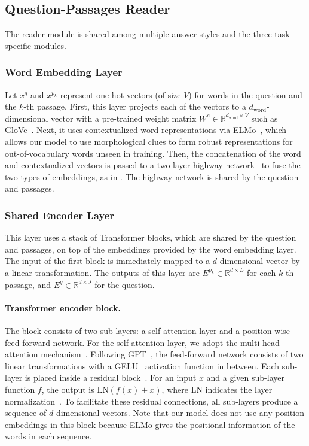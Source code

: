 \documentclass[11pt,a4paper]{article}
\theoremstyle{mydef}
\theoremstyle{myprob}
\begin{document}
\subsection{Question-Passages Reader}
\label{sec:reader}

The reader module is shared among multiple answer styles and the three task-specific modules.

\subsubsection{Word Embedding Layer}

Let $x^q$ and $x^{p_k}$ represent 
one-hot vectors (of size $V$) for 
words in the question and the $k$-th passage. First, this layer projects each of the vectors to a $d_\mathrm{word}$-dimensional vector with a pre-trained weight matrix $W^e \in \mathbb{R}^{d_\mathrm{word} \times V}$ such as GloVe~\citep{PenningtonSM14}. Next, it uses contextualized word representations via ELMo~\citep{PetersNIGCLZ18}, which 
allows our model to use morphological clues to form robust representations for out-of-vocabulary words unseen in training. 
Then, the concatenation of the word and contextualized vectors is passed to a two-layer highway network~\citep{SrivastavaGS15} to fuse the two types of embeddings, as in \citep{SeoKFH17}.
The highway network is shared %
by the question and passages. 

\subsubsection{Shared Encoder Layer}
\label{sec:tfenc}

This layer uses a stack of Transformer blocks, which are shared by the question and passages, on top of the embeddings provided by the word embedding layer. The input of the first block is immediately 
mapped to a $d$-dimensional vector by a linear transformation.
The outputs of this layer are $E^{p_k} \in \mathbb{R}^{d \times L}$ for each $k$-th passage, and $E^q \in \mathbb{R}^{d \times J}$ for the question.

\paragraph{Transformer encoder block.} The block consists of two sub-layers: a self-attention layer and a position-wise feed-forward network. For the self-attention layer, we adopt the multi-head attention mechanism~\citep{VaswaniSPUJGKP17}. 
Following GPT~\citep{RadfordNSS18}, the feed-forward network consists of two linear transformations with a GELU~\citep{HendrycksG16} activation function in between.
Each sub-layer is placed inside a residual block~\citep{HeZRS16}. For an input $x$ and a given sub-layer function $f$, the output is $\mathrm{LN}(f(x)+x)$, where $\mathrm{LN}$ indicates the layer normalization~\citep{BaKH16}.
To facilitate these residual connections, 
all sub-layers produce a sequence of $d$-dimensional vectors.
Note that our model does not use any position embeddings in this block because ELMo gives the positional information of the words in each sequence.
\end{document}
